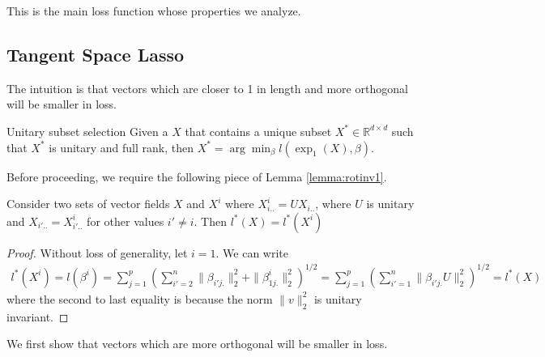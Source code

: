 \documentclass[a4paper,11pt]{article}
\begin{document}
This is the main loss function whose properties we analyze.



\subsection{Tangent Space Lasso}

The intuition is that vectors which are closer to 1 in length and more orthogonal will be smaller in loss.

\begin{proposition}{Unitary subset selection}
Given a $X$ that contains a unique subset $X^* \in \mathbb R^{d \times d} $ such that $X^*$ is unitary and full rank, then $X^* = \arg \min_\beta l(\exp_1(X),\beta)$.
\end{proposition}


Before proceeding, we require the following piece of Lemma \ref{lemma:rotinv1}. 
 \begin{proposition}
 \label{prop:unitarybasis}
Consider two sets of vector fields $X$ and $X^i$ where $X_{i..}^i = U X_{i..} $, where $U$ is unitary and $X_{i'..} = X_{i'..}^i$ for other values $i' \neq i$.
Then $l^*(X) = l^*(X^i)$
\end{proposition}

\begin{proof}
Without loss of generality, let $i = 1$.
We can write 
\begin{eqnarray}
l^*(X^i) = l(\beta^i) = \sum_{j = 1}^p (\sum_{i'=2}^n \| \beta_{i'j.} \|_2^2 +  \|  \beta_{1j.}^i \|_2^2 )^{1/2}=  \sum_{j = 1}^p (\sum_{i'=1}^n \| \beta_{i'j.} U \|_2^2)^{1/2} = l^*(X)
\end{eqnarray}
where the second to last equality is because the norm $\|v\|_2^2 $ is unitary invariant.
\end{proof}



We first show that vectors which are more orthogonal will be smaller in loss.
\end{document}
